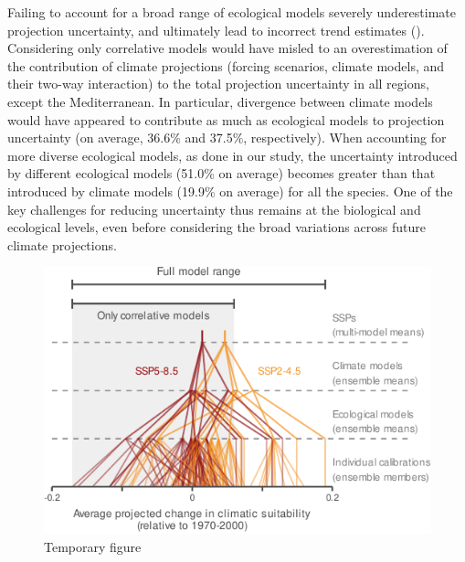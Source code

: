 \documentclass[11pt,letter]{article}
\begin{document}
Failing to account for a broad range of ecological models severely underestimate projection uncertainty, and ultimately lead to incorrect trend estimates (). Considering only correlative models would have misled to an overestimation of the contribution of climate projections (forcing scenarios, climate models, and their two-way interaction) to the total projection uncertainty in all regions, except the Mediterranean. In particular, divergence between climate models would have appeared to contribute as much as ecological models to projection uncertainty (on average, 36.6\% and 37.5\%, respectively). When accounting for more diverse ecological models, as done in our study, the uncertainty introduced by different ecological models (51.0\% on average) becomes greater than that introduced by climate models (19.9\% on average) for all the species. One of the key challenges for reducing uncertainty thus remains at the biological and ecological levels, even before considering the broad variations across future climate projections.


\begin{figure}
	\centering
	\includegraphics[width=0.6\linewidth]{../newfigures/files/uncertaintycascade}
	\caption{Temporary figure}
	\label{fig:cascade}
\end{figure}
\end{document}

